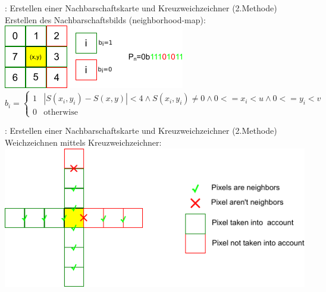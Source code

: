 \documentclass{VLKlauck}
\begin{document}
	\begin{frame}{\insertsubsection: Erstellen einer Nachbarschaftskarte und Kreuzweichzeichner (2.Methode)}
	 	Erstellen des Nachbarschaftsbilds (neighborhood-map):\\[0.5cm]
	 	\includegraphics[width=\textwidth]{neighborhoodmap.pdf}\\
	 	{\tiny
	 	$$
	 	 b_i = \left\{ 
	 	\begin{array}{ll}
	         1 & \left|S(x_i,y_i)-S(x,y)\right|<4  \wedge   S(x_i,y_i) \neq 0 \wedge 0<=x_i<u  \wedge 0<=y_i<v\\
	         0 & \mbox{otherwise} 
	 	\end{array}
		\right.   
	 	$$
	 	}
	\end{frame}
	  
	\begin{frame}{\insertsubsection: Erstellen einer Nachbarschaftskarte und Kreuzweichzeichner (2.Methode)}
	 	Weichzeichnen mittels Kreuzweichzeichner:\\[0.5cm]
	 	\includegraphics[width=\textwidth]{crossBlur.pdf}
	\end{frame}
	   
\end{document}
